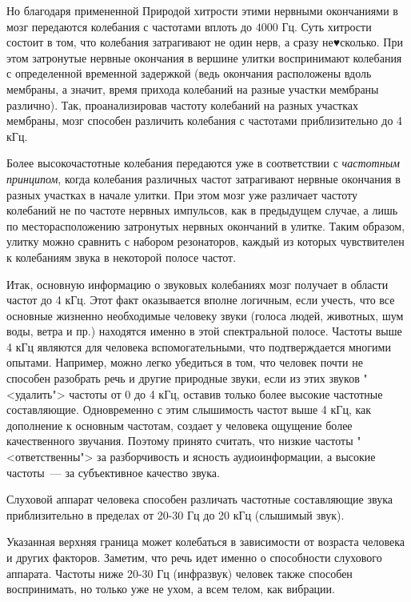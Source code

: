 \documentclass[oneside, final, 14pt]{extreport}
\begin{document}
Но благодаря примененной Природой хитрости этими нервными окончаниями в мозг передаются колебания с частотами вплоть до $4000$ Гц. Суть хитрости состоит в том, что колебания затрагивают не один нерв, а сразу не♥сколько. При этом затронутые нервные окончания в вершине улитки воспринимают колебания с определенной временной задержкой (ведь окончания расположены вдоль мембраны, а значит, время прихода колебаний на разные участки мембраны различно). Так, проанализировав частоту колебаний на разных участках мембраны, мозг способен различить колебания с частотами приблизительно до 4 кГц.

Более высокочастотные колебания передаются уже в соответствии с {\itshape частотным принципом}, когда колебания различных частот затрагивают нервные окончания в разных участках в начале улитки. При этом мозг уже различает частоту
колебаний не по частоте нервных импульсов, как в предыдущем случае, а лишь по месторасположению затронутых нервных окончаний в улитке. Таким образом, улитку можно сравнить с набором резонаторов, каждый из которых чувствителен к колебаниям звука в некоторой полосе частот.

Итак, основную информацию о звуковых колебаниях мозг получает в области частот до 4 кГц. Этот факт оказывается вполне логичным, если учесть, что все основные жизненно необходимые человеку звуки (голоса людей, животных, шум воды, ветра и пр.) находятся именно в этой спектральной полосе. Частоты выше 4 кГц являются для человека вспомогательными, что подтверждается многими опытами. Например, можно легко убедиться в том, что человек почти не способен разобрать речь и другие природные звуки, если из этих звуков "<удалить"> частоты от 0 до 4 кГц, оставив только более высокие частотные составляющие. Одновременно с этим слышимость частот выше 4 кГц, как дополнение к основным частотам, создает у человека ощущение более качественного звучания. Поэтому принято считать, что низкие частоты "<ответственны"> за разборчивость и ясность аудиоинформации, а высокие частоты~--- за субъективное качество звука.

Слуховой аппарат человека способен различать частотные составляющие звука приблизительно в пределах от 20-30 Гц до 20 кГц (слышимый звук). 

Указанная верхняя граница может колебаться в зависимости от возраста человека и других факторов. Заметим, что речь идет именно о способности слухового аппарата. Частоты ниже 20-30 Гц (инфразвук) человек также способен воспринимать, но только уже не ухом, а всем телом, как вибрации.
\end{document}
